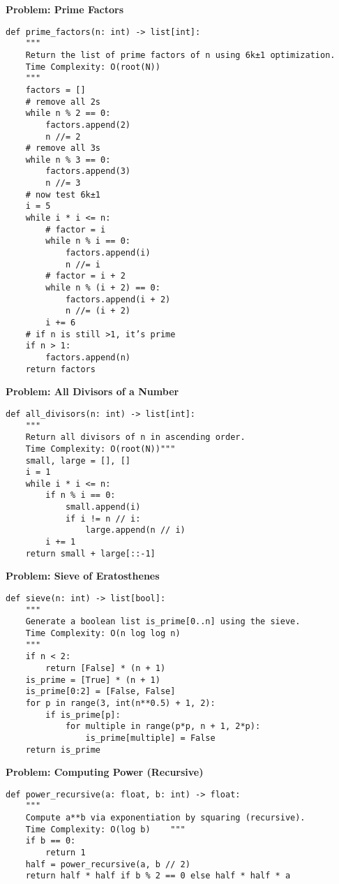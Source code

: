 \noindent\textbf{Problem: Prime Factors}
\begin{verbatim}
def prime_factors(n: int) -> list[int]:
    """
    Return the list of prime factors of n using 6k±1 optimization.
    Time Complexity: O(root(N))
    """
    factors = []
    # remove all 2s
    while n % 2 == 0:
        factors.append(2)
        n //= 2
    # remove all 3s
    while n % 3 == 0:
        factors.append(3)
        n //= 3
    # now test 6k±1
    i = 5
    while i * i <= n:
        # factor = i
        while n % i == 0:
            factors.append(i)
            n //= i
        # factor = i + 2
        while n % (i + 2) == 0:
            factors.append(i + 2)
            n //= (i + 2)
        i += 6
    # if n is still >1, it’s prime
    if n > 1:
        factors.append(n)
    return factors
\end{verbatim}
\noindent\textbf{Problem: All Divisors of a Number}
\begin{verbatim}
def all_divisors(n: int) -> list[int]:
    """
    Return all divisors of n in ascending order.
    Time Complexity: O(root(N))"""
    small, large = [], []
    i = 1
    while i * i <= n:
        if n % i == 0:
            small.append(i)
            if i != n // i:
                large.append(n // i)
        i += 1
    return small + large[::-1]
\end{verbatim}
\noindent\textbf{Problem: Sieve of Eratosthenes}
\begin{verbatim}
def sieve(n: int) -> list[bool]:
    """
    Generate a boolean list is_prime[0..n] using the sieve.
    Time Complexity: O(n log log n)
    """
    if n < 2:
        return [False] * (n + 1)
    is_prime = [True] * (n + 1)
    is_prime[0:2] = [False, False]
    for p in range(3, int(n**0.5) + 1, 2):
        if is_prime[p]:
            for multiple in range(p*p, n + 1, 2*p):
                is_prime[multiple] = False
    return is_prime
\end{verbatim}
\noindent\textbf{Problem: Computing Power (Recursive)}
\begin{verbatim}
def power_recursive(a: float, b: int) -> float:
    """
    Compute a**b via exponentiation by squaring (recursive).
    Time Complexity: O(log b)    """
    if b == 0:
        return 1
    half = power_recursive(a, b // 2)
    return half * half if b % 2 == 0 else half * half * a
\end{verbatim}

